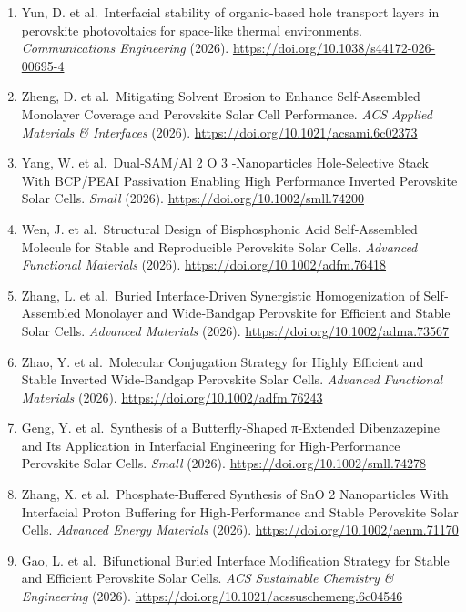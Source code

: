\documentclass[
  11pt,
]{article}
\begin{document}
\begin{enumerate}
  on Transient Photovoltage/Current Mapping. \emph{ACS Applied Energy
  Materials} (2026). \url{https://doi.org/10.1021/acsaem.6c00612}
\item
  Yun, D. et al.~Interfacial stability of organic-based hole transport
  layers in perovskite photovoltaics for space-like thermal
  environments. \emph{Communications Engineering} (2026).
  \url{https://doi.org/10.1038/s44172-026-00695-4}
\item
  Zheng, D. et al.~Mitigating Solvent Erosion to Enhance Self-Assembled
  Monolayer Coverage and Perovskite Solar Cell Performance. \emph{ACS
  Applied Materials \& Interfaces} (2026).
  \url{https://doi.org/10.1021/acsami.6c02373}
\item
  Yang, W. et al.~Dual‐SAM/Al 2 O 3 ‐Nanoparticles Hole‐Selective Stack
  With BCP/PEAI Passivation Enabling High Performance Inverted
  Perovskite Solar Cells. \emph{Small} (2026).
  \url{https://doi.org/10.1002/smll.74200}
\item
  Wen, J. et al.~Structural Design of Bisphosphonic Acid Self‐Assembled
  Molecule for Stable and Reproducible Perovskite Solar Cells.
  \emph{Advanced Functional Materials} (2026).
  \url{https://doi.org/10.1002/adfm.76418}
\item
  Zhang, L. et al.~Buried Interface‐Driven Synergistic Homogenization of
  Self‐Assembled Monolayer and Wide‐Bandgap Perovskite for Efficient and
  Stable Solar Cells. \emph{Advanced Materials} (2026).
  \url{https://doi.org/10.1002/adma.73567}
\item
  Zhao, Y. et al.~Molecular Conjugation Strategy for Highly Efficient
  and Stable Inverted Wide‐Bandgap Perovskite Solar Cells.
  \emph{Advanced Functional Materials} (2026).
  \url{https://doi.org/10.1002/adfm.76243}
\item
  Geng, Y. et al.~Synthesis of a Butterfly‐Shaped π‐Extended
  Dibenzazepine and Its Application in Interfacial Engineering for
  High‐Performance Perovskite Solar Cells. \emph{Small} (2026).
  \url{https://doi.org/10.1002/smll.74278}
\item
  Zhang, X. et al.~Phosphate‐Buffered Synthesis of SnO 2 Nanoparticles
  With Interfacial Proton Buffering for High‐Performance and Stable
  Perovskite Solar Cells. \emph{Advanced Energy Materials} (2026).
  \url{https://doi.org/10.1002/aenm.71170}
\item
  Gao, L. et al.~Bifunctional Buried Interface Modification Strategy for
  Stable and Efficient Perovskite Solar Cells. \emph{ACS Sustainable
  Chemistry \& Engineering} (2026).
  \url{https://doi.org/10.1021/acssuschemeng.6c04546}

\end{enumerate}
\end{document}
